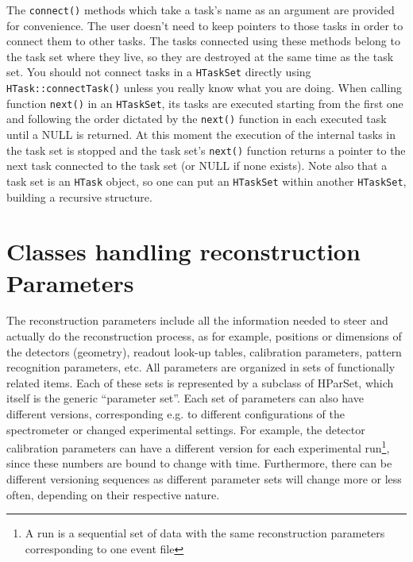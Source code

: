 The \verb+connect()+ methods which take a task's name as an argument are provided for convenience. 
The user doesn't need to keep pointers to those tasks in order to connect them to other tasks.
The tasks connected using these methods belong to the task set where they live, so they are 
destroyed at the same time as the task set. You should not connect tasks in a \verb+HTaskSet+ 
directly using 
\newline
\verb+HTask::connectTask()+ unless you really know what you are doing.
When calling function \verb+next()+ in an \verb+HTaskSet+, its tasks are executed starting from 
the first one and following the order dictated by the \verb+next()+ function in each executed 
task until a NULL is returned. At this moment the execution of the internal tasks in the task 
set is stopped and the task set's \verb+next()+ function returns a pointer to the next task 
connected to the task set (or NULL if none exists).
Note also that a task set is an \verb+HTask+ object, so one can put an \verb+HTaskSet+ within 
another \verb+HTaskSet+, building a recursive structure. 

\section{Classes handling reconstruction Parameters}

The reconstruction parameters include all the information needed to steer and actually do 
the reconstruction process, as for example, positions or dimensions of the detectors (geometry), 
readout look-up tables, calibration parameters, pattern recognition parameters, etc. All 
parameters are organized in sets of functionally related items. Each of these sets is 
represented by a subclass of HParSet, which itself is the generic ``parameter set''. 
Each set of parameters can also have different versions, corresponding e.g. to different 
configurations of the spectrometer or changed experimental settings. For example, the 
detector calibration parameters can have a different version for each experimental 
run\footnote{A run is a sequential set of data with the same reconstruction parameters 
corresponding to one event file}, since these numbers are bound to change with time. 
Furthermore, there can be different versioning sequences as different parameter sets 
will change more or less often, depending on their respective nature.

